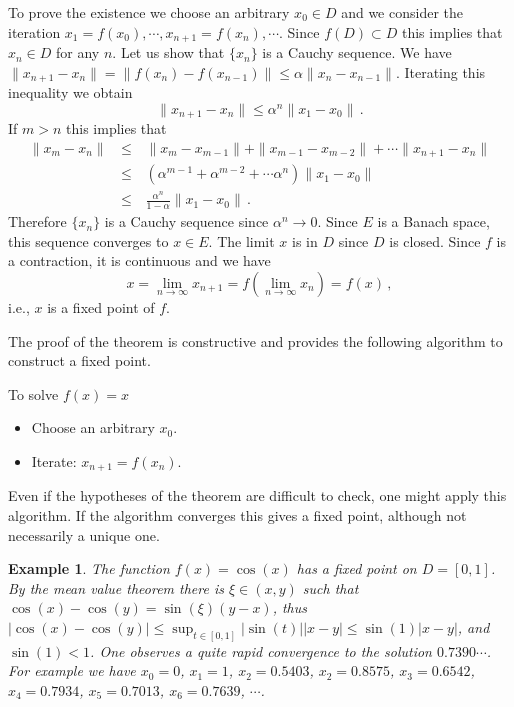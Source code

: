 \documentclass[12pt]{report}
\newtheorem{example}[theorem]{Example}
\newcommand{\nn}{\nonumber}
\def\qed{\hbox{\hskip 6pt\vrule width6pt height7pt depth1pt
    \hskip1pt}\bigskip}
\def\to{\rightarrow}
\begin{document}
To prove the existence we choose an arbitrary $x_0 \in D$ and we
consider the iteration $x_1=f(x_0), \cdots, x_{n+1}=f(x_n), \cdots$.
Since $f(D) \subset D $ this implies that $x_n \in D$ for any $n$. Let
us show that $\{x_n\}$ is a Cauchy sequence.  We have $\| x_{n+1} -
x_n\| = \| f(x_n) - f(x_{n-1})\| \le \alpha \| x_n -
x_{n-1}\|$. Iterating this inequality we obtain
\begin{equation}
\| x_{n+1} - x_n \| \le \alpha^n \| x_1 - x_0\| \,.
\end{equation}
If $m > n$ this implies that
\begin{eqnarray}
\| x_m - x_n \| \,&\le& \,  \|x_m - x_{m-1}\| + \| x_{m-1} - x_{m-2}\| 
+ \cdots \|x_{n+1} - x_n \| \nn \\
\,&\le& \,  \left(\alpha^{m-1} + \alpha^{m-2} + \cdots \alpha^n \right) 
\|x_1 - x_0\|  \nn \\
\,&\le& \,  \frac{\alpha^n}{1 -\alpha} \|x_1 - x_0 \| \,.
 \end{eqnarray}
 Therefore $\{ x_n\}$ is a Cauchy sequence since $\alpha^n \to 0$.
 Since $E$ is a Banach space, this sequence converges to $x \in E$. The
 limit $x$ is in $D$ since $D$ is closed. Since $f$ is a contraction,
 it is continuous and we have
 \begin{equation}
 x = \lim_{n \to \infty} x_{n+1} = f (\lim_{n \to \infty} x_n) = f(x) \,,
 \end{equation} 
 i.e., $x$ is a fixed point of $f$. \hfill \qed
 
The proof of the theorem is constructive and provides the following
algorithm to construct a fixed point.

\vspace{2mm}
  To solve $f(x)=x$
\begin{itemize}
\item Choose an arbitrary $x_0$. 
\item Iterate: $x_{n+1} = f(x_n)$. 
 \end{itemize}
Even if the hypotheses of the theorem are difficult to check, one
might apply this algorithm. If the algorithm converges this gives a fixed
point, although not necessarily a unique one.

\begin{example}{\rm 
The function $f(x)= \cos(x)$ has a fixed point on $D=[0,1]$.  By the
mean value theorem there is $\xi \in (x,y)$ such that $\cos(x) -
\cos(y) = \sin(\xi)(y-x)$, thus $|\cos(x) - \cos(y)| \leq \sup_{t \in
[0,1]} |\sin(t)||x-y| \leq \sin(1) |x-y| $, and $\sin(1) <1$. 
One observes a quite rapid convergence to the solution $0.7390\cdots$. 
For example we have $x_0=0$, $x_1=1$, $x_2=0.5403$, $x_2=0.8575$, 
$x_3=0.6542$, $x_4=0.7934$, $x_5=0.7013$, $x_6=0.7639$, $\cdots$. 
}
\end{example}
\end{document}
